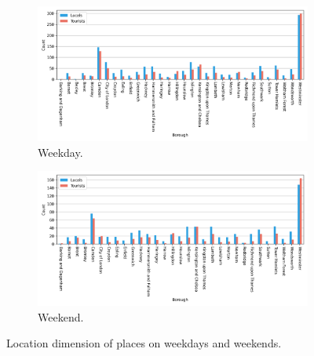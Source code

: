 \documentclass{article}
\theoremstyle{definition}
\theoremstyle{remark}
\begin{document}
\begin{figure}[!h]

\centering
\begin{subfigure}{0.6\textheight}
\centering
\includegraphics[width=0.9\linewidth]{figures/places_location_weekday.png}
\caption{Weekday.}
\label{fig:places_location_weekday}
\end{subfigure}
\begin{subfigure}{0.6\textheight}
\centering
\includegraphics[width=0.9\linewidth]{figures/places_location_weekend.png}
\caption{Weekend.}
\label{fig:places_location_weekend}
\end{subfigure}

\caption{Location dimension of places on weekdays and weekends.}
\label{fig:places_location_week}
\end{figure}
\end{document}

